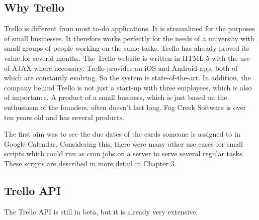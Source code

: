 \subsection{Why Trello}
Trello is different from most to-do applications. It is streamlined for the purposes of small businesses. It therefore works perfectly for the needs of a university with small groups of people working on the same tasks. Trello has already proved its value for several months. The Trello website is written in HTML 5 with the use of AJAX where necessary. Trello provides an iOS \cite{trello:ios} and Android \cite{trello:android} app, both of which are constantly evolving. So the system is state-of-the-art. In addition, the company behind Trello is not just a start-up with three employees, which is also of importance. A product of a small business, which is just based on the enthusiasm of the founders, often doesn't last long. Fog Creek Software is over ten years old and has several products.

The first aim was to see the due dates of the cards someone is assigned to in Google Calendar. Considering this, there were many other use cases for small scripts which could run as cron jobs on a server to serve several regular tasks. These scripts are described in more detail in Chapter 3.

\subsection{Trello API}
The Trello API  is still in beta, but it is already very extensive. \cite{trello:docu}

